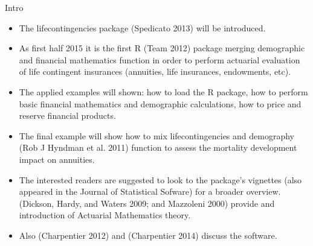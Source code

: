 \begin{frame}{Intro}

\begin{itemize}[<+->]
\itemsep1pt\parskip0pt
\item
  The lifecontingencies package (Spedicato 2013) will be introduced.
\item
  As first half 2015 it is the first R (Team 2012) package merging
  demographic and financial mathematics function in order to perform
  actuarial evaluation of life contingent insurances (annuities, life
  insurances, endowments, etc).
\item
  The applied examples will shown: how to load the R package, how to
  perform basic financial mathematics and demographic calculations, how
  to price and reserve financial products.
\end{itemize}

\end{frame}

\begin{frame}

\begin{itemize}[<+->]
\itemsep1pt\parskip0pt
\item
  The final example will show how to mix lifecontingencies and
  demography (Rob J Hyndman et al. 2011) function to assess the
  mortality development impact on annuities.
\item
  The interested readers are suggested to look to the package's
  vignettes (also appeared in the Journal of Statistical Sofware) for a
  broader overview. (Dickson, Hardy, and Waters 2009; and Mazzoleni
  2000) provide and introduction of Actuarial Mathematics theory.
\item
  Also (Charpentier 2012) and (Charpentier 2014) discuss the software.
\end{itemize}

\end{frame}


